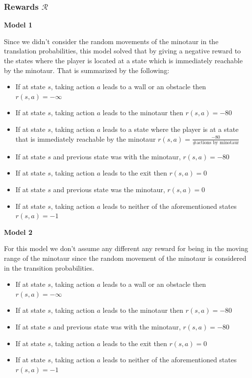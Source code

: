 \documentclass{article}
\begin{document}
\subsubsection{Rewards $\mathcal{R}$}
\textbf{Model 1}
\par
Since we didn't consider the random movements of the minotaur in the translation probabilities, this model solved that by giving a negative reward to the states where the player is located at a state which is immediately reachable by the minotaur. That is summarized by the following:
\begin{itemize}
    \item If at state $s$, taking action $a$ leads to a wall or an obstacle then $r(s,a) = -\infty$
    \item If at state $s$, taking action $a$ leads to the minotaur then $ r(s,a) = -80 $
    \item If at state $s$, taking action $a$ leads to a state where the player is at a state that is immediately reachable by the minotaur  $ r(s,a) = \frac{-80}{\textrm{\#actions by minotaur}}$
    \item If at state $s$ and previous state was with the minotaur, $r(s,a)=-80$
    \item If at state $s$, taking action $a$ leads to the exit then $ r(s,a) = 0 $
    \item If at state $s$ and previous state was the minotaur, $r(s,a)=0$
    \item If at state $s$, taking action $a$ leads to neither of the aforementioned states $ r(s,a) = -1 $
\end{itemize}

\textbf{Model 2}
\par
For this model we don't assume any different any reward for being in the moving range of the minotaur since the random movement of the minotaur is considered in the transition probabilities.
\begin{itemize}
    \item If at state $s$, taking action $a$ leads to a wall or an obstacle then $r(s,a) = -\infty$
    \item If at state $s$, taking action $a$ leads to the minotaur then $ r(s,a) = -80 $
    \item If at state $s$ and previous state was with the minotaur, $r(s,a)=-80$
    \item If at state $s$, taking action $a$ leads to the exit then $ r(s,a) = 0 $
    \item If at state $s$, taking action $a$ leads to neither of the aforementioned states $ r(s,a) = -1 $
\end{itemize}
\end{document}
